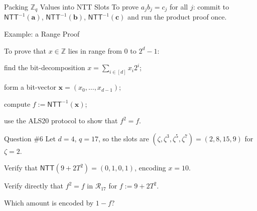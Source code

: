 \documentclass{zkdl-presentation-template}
\begin{document}
\begin{frame}{Packing $\mathbb{Z}_q$ Values into NTT Slots}
        To prove $a_jb_j = c_j$ for all $j$: commit to $\mathsf{NTT}^{-1}(\mathbf{a})$, $\mathsf{NTT}^{-1}(\mathbf{b})$, $\mathsf{NTT}^{-1}(\mathbf{c})$ and run the product proof once.
    \end{frame}

    \begin{frame}{Example: a Range Proof}
        \begin{example}
            To prove that $x \in \mathbb{Z}$ lies in range from $0$ to $2^d-1$:
            \begin{algoen}
                \item find the bit-decomposition $x = \sum_{i \in [d]}x_i2^i$;
                \item form a bit-vector $\mathbf{x} = (x_0,\dots,x_{d-1})$;
                \item compute $f := \mathsf{NTT}^{-1}(\mathbf{x})$; 
                \item use the ALS20 protocol to show that $f^2=f$.
            \end{algoen}
        \end{example}
        \pause

        \begin{questionblock}{Question \#6}
            Let $d = 4$, $q = 17$, so the slots are $(\zeta, \zeta^3, \zeta^5, \zeta^7) = (2, 8, 15, 9)$ for $\zeta = 2$.
            \begin{algoen}
                \item Verify that $\mathsf{NTT}(9 + 2T^2) = (0, 1, 0, 1)$, encoding $x = 10$.
                \item Verify directly that $f^2 = f$ in $\mathcal{R}_{17}$ for $f := 9 + 2T^2$.
                \item Which amount is encoded by $1 - f$?
            \end{algoen}
        \end{questionblock}
    \end{frame}
\end{document}

